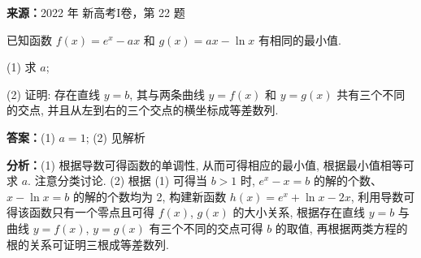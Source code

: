 \begin{question}[points=12]
\textbf{来源：}2022 年 新高考I卷，第 22 题\par
已知函数 $f(x) = e^x - ax$ 和 $g(x) = ax - \ln x$ 有相同的最小值.

(1) 求 $a$;

(2) 证明: 存在直线 $y = b$, 其与两条曲线 $y = f(x)$ 和 $y = g(x)$ 共有三个不同的交点, 并且从左到右的三个交点的横坐标成等差数列.
\begin{solution}
\textbf{答案：}(1) $a = 1$; (2) 见解析

\textbf{分析：}(1) 根据导数可得函数的单调性, 从而可得相应的最小值, 根据最小值相等可求 $a$. 注意分类讨论. (2) 根据 (1) 可得当 $b > 1$ 时, $e^x - x = b$ 的解的个数、 $x - \ln x = b$ 的解的个数均为 2, 构建新函数 $h(x) = e^x + \ln x - 2x$, 利用导数可得该函数只有一个零点且可得 $f(x)$, $g(x)$ 的大小关系, 根据存在直线 $y = b$ 与曲线 $y = f(x)$, $y = g(x)$ 有三个不同的交点可得 $b$ 的取值, 再根据两类方程的根的关系可证明三根成等差数列.


\end{solution}
\end{question}

